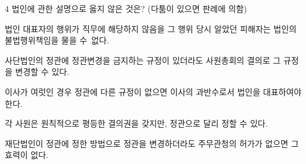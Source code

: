 \begin{question}{4}
법인에 관한 설명으로 옳지 않은 것은? (다툼이 있으면 판례에 의함)
\begin{choices}
  \item 법인 대표자의 행위가 직무에 해당하지 않음을 그 행위 당시 알았던 피해자는 법인의 불법행위책임을 물을 수 없다.
  \item 사단법인의 정관에 정관변경을 금지하는 규정이 있더라도 사원총회의 결의로 그 규정을 변경할 수 있다.
  \item 이사가 여럿인 경우 정관에 다른 규정이 없으면 이사의 과반수로서 법인을 대표하여야 한다.
  \item 각 사원은 원칙적으로 평등한 결의권을 갖지만, 정관으로 달리 정할 수 있다.
  \item 재단법인이 정관에 정한 방법으로 정관을 변경하더라도 주무관청의 허가가 없으면 그 효력이 없다.
\end{choices}
\end{question}
